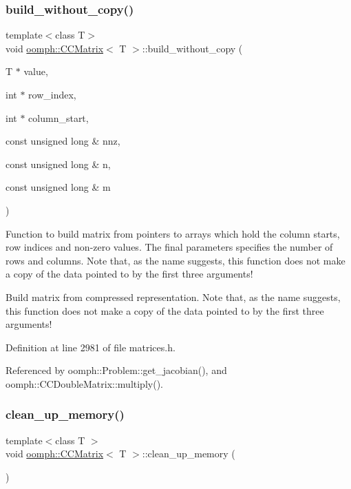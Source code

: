 \subsubsection{\texorpdfstring{build\+\_\+without\+\_\+copy()}{build\_without\_copy()}}
{\footnotesize\ttfamily template$<$class T$>$ \\
void \hyperlink{classoomph_1_1CCMatrix}{oomph\+::\+C\+C\+Matrix}$<$ T $>$\+::build\+\_\+without\+\_\+copy (\begin{DoxyParamCaption}\item[{T $\ast$}]{value,  }\item[{int $\ast$}]{row\+\_\+index,  }\item[{int $\ast$}]{column\+\_\+start,  }\item[{const unsigned long \&}]{nnz,  }\item[{const unsigned long \&}]{n,  }\item[{const unsigned long \&}]{m }\end{DoxyParamCaption})}



Function to build matrix from pointers to arrays which hold the column starts, row indices and non-\/zero values. The final parameters specifies the number of rows and columns. Note that, as the name suggests, this function does not make a copy of the data pointed to by the first three arguments! 

Build matrix from compressed representation. Note that, as the name suggests, this function does not make a copy of the data pointed to by the first three arguments! 

Definition at line 2981 of file matrices.\+h.



Referenced by oomph\+::\+Problem\+::get\+\_\+jacobian(), and oomph\+::\+C\+C\+Double\+Matrix\+::multiply().

\mbox{\label{classoomph_1_1CCMatrix_af3f7a40493a8576558e211c681b1ca3c}} 
\subsubsection{\texorpdfstring{clean\+\_\+up\+\_\+memory()}{clean\_up\_memory()}}
{\footnotesize\ttfamily template$<$class T $>$ \\
void \hyperlink{classoomph_1_1CCMatrix}{oomph\+::\+C\+C\+Matrix}$<$ T $>$\+::clean\+\_\+up\+\_\+memory (\begin{DoxyParamCaption}{ }\end{DoxyParamCaption})}



